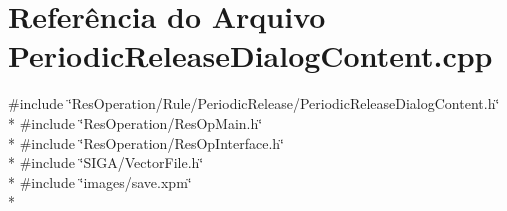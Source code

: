 \section{Referência do Arquivo Periodic\+Release\+Dialog\+Content.\+cpp}
\label{_rule_2_periodic_release_2_periodic_release_dialog_content_8cpp}
{\ttfamily \#include \char`\"{}Res\+Operation/\+Rule/\+Periodic\+Release/\+Periodic\+Release\+Dialog\+Content.\+h\char`\"{}}\\*
{\ttfamily \#include \char`\"{}Res\+Operation/\+Res\+Op\+Main.\+h\char`\"{}}\\*
{\ttfamily \#include \char`\"{}Res\+Operation/\+Res\+Op\+Interface.\+h\char`\"{}}\\*
{\ttfamily \#include \char`\"{}S\+I\+G\+A/\+Vector\+File.\+h\char`\"{}}\\*
{\ttfamily \#include \char`\"{}images/save.\+xpm\char`\"{}}\\*

